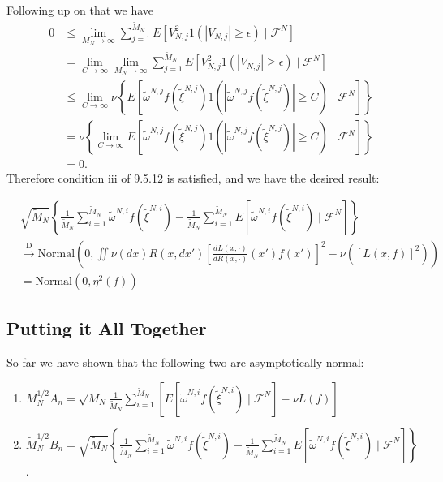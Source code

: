 \documentclass{article}
\begin{document}
Following up on that we have 
\begin{align*}
0 &\le \lim_{M_N \to \infty} \sum_{j=1}^{\tilde{M}_N} E[V_{N,j}^2 1\left( |V_{N,j}| \ge \epsilon \right) \mid \mathcal{F}^N] \\
&= \lim_{C \to \infty} \lim_{M_N \to \infty} \sum_{j=1}^{\tilde{M}_N} E[V_{N,j}^2 1\left( |V_{N,j}| \ge \epsilon \right) \mid \mathcal{F}^N] \tag{no $C$ so limit doesn't matter}\\
&\le \lim_{C \to \infty} \nu\left\{ E[ \tilde{\omega}^{N,j} f(\tilde{\xi}^{N,j}) 1\left( |\tilde{\omega}^{N,j} f(\tilde{\xi}^{N,j})| \ge C \right) \mid \mathcal{F}^N] \right\} \tag{above work} \\
&= \nu\left\{ \lim_{C \to \infty} E[ \tilde{\omega}^{N,j} f(\tilde{\xi}^{N,j}) 1\left( |\tilde{\omega}^{N,j} f(\tilde{\xi}^{N,j})| \ge C \right) \mid \mathcal{F}^N] \right\} \tag{DCT} \\
&= 0.
\end{align*}
Therefore condition iii of 9.5.12 is satisfied, and we have the desired result:


\begin{align*}
& \sqrt{\tilde{M}_N}\left\{  \frac{1}{\tilde{M}_N} \sum_{i=1}^{\tilde{M}_N} \tilde{\omega}^{N,i} f(\tilde{\xi}^{N,i}) -  \frac{1}{\tilde{M}_N} \sum_{i=1}^{\tilde{M}_N} E[ \tilde{\omega}^{N,i} f(\tilde{\xi}^{N,i}) \mid \mathcal{F}^N] \right\} \\
& \overset{\text{D}}{\to}
\text{Normal}\left( 0, 
\iint \nu(dx) R(x,dx')\left[ \frac{dL(x,\cdot)}{dR(x,\cdot)}(x') f(x') \right]^2
-\nu\left(\left[L(x,f) \right]^2\right)\right) \\
& =
\text{Normal}\left( 0, 
\eta^2(f)\right)
\end{align*}



\subsection{Putting it All Together}


So far we have shown that the following two are asymptotically normal:
\begin{enumerate}
\item $M_N^{1/2}A_n = \sqrt{M_N} \frac{1}{\tilde{M}_N} \sum_{i=1}^{\tilde{M}_N} \left[ E[ \tilde{\omega}^{N,i} f(\tilde{\xi}^{N,i}) \mid \mathcal{F}^N] - \nu L(f) \right]$
\item $\tilde{M}_N^{1/2} B_n = \sqrt{\tilde{M}_N}\left\{  \frac{1}{\tilde{M}_N} \sum_{i=1}^{\tilde{M}_N} \tilde{\omega}^{N,i} f(\tilde{\xi}^{N,i}) -  \frac{1}{\tilde{M}_N} \sum_{i=1}^{\tilde{M}_N} E[ \tilde{\omega}^{N,i} f(\tilde{\xi}^{N,i}) \mid \mathcal{F}^N] \right\} $.
\end{enumerate}
\end{document}
